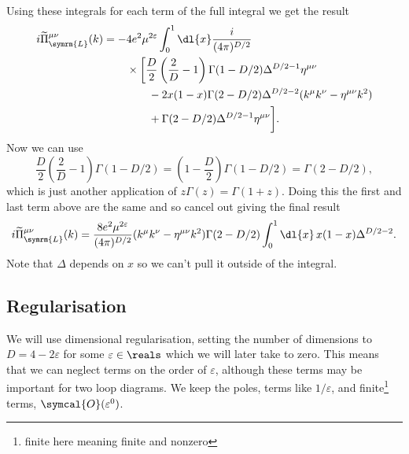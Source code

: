 \documentclass[fleqn]{NotesClass}
\newcommand{\order}{\symcal{O}}
\newcommand{\minkowskiMetric}{\eta}
\begin{document}
    Using these integrals for each term of the full integral we get the result
    \begin{align}
        i\widetilde{\Pi}^{\mu\nu}_{\symrm{L}}(k) = -&4e^2\mu^{2\varepsilon} \int_0^1 \dl{x} \frac{i}{(4\pi)^{D/2}} \\
        &\times\bigg[ \frac{D}{2}\left( \frac{2}{D} - 1 \right)\Gamma(1 - D/2) \Delta^{D/2 - 1} \minkowskiMetric^{\mu\nu} \notag\\
        &\qquad - 2x(1 - x)\Gamma(2 - D/2)\Delta^{D/2 - 2}(k^\mu k^\nu - \minkowskiMetric^{\mu\nu}k^2) \notag\\
        &\qquad + \Gamma(2 - D/2)\Delta^{D/2 - 1}\minkowskiMetric^{\mu\nu} \bigg]. \notag
    \end{align}
    Now we can use
    \begin{equation}
        \frac{D}{2}\left( \frac{2}{D} - 1 \right)\Gamma(1 - D/2) = \left( 1 - \frac{D}{2} \right)\Gamma(1 - D/2) = \Gamma(2 - D/2),
    \end{equation}
    which is just another application of \(z\Gamma(z) = \Gamma(1 + z)\).
    Doing this the first and last term above are the same and so cancel out giving the final result
    \begin{equation}
        i\widetilde{\Pi}^{\mu\nu}_{\symrm{L}}(k) = \frac{8e^2\mu^{2\varepsilon}}{(4\pi)^{D/2}} (k^\mu k^\nu - \minkowskiMetric^{\mu\nu} k^2)\Gamma(2 - D/2) \int_0^1 \dl{x} \, x(1 - x) \Delta^{D/2 - 2}.
    \end{equation}
    Note that \(\Delta\) depends on \(x\) so we can't pull it outside of the integral.
    
    \subsection{Regularisation}
    We will use dimensional regularisation, setting the number of dimensions to \(D = 4 - 2\varepsilon\) for some \(\varepsilon \in \reals\) which we will later take to zero.
    This means that we can neglect terms on the order of \(\varepsilon\), although these terms may be important for two loop diagrams.
    We keep the poles, terms like \(1/\varepsilon\), and finite\footnote{finite here meaning finite and nonzero} terms, \(\order(\varepsilon^0)\).
    
\end{document}
